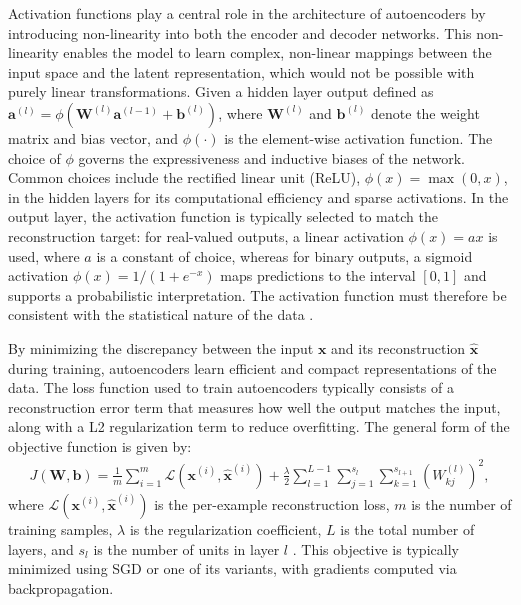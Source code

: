 Activation functions play a central role in the architecture of autoencoders by introducing non-linearity into both the encoder and decoder networks. This non-linearity enables the model to learn complex, non-linear mappings between the input space and the latent representation, which would not be possible with purely linear transformations. Given a hidden layer output defined as $\mathbf{a}^{(l)} = \phi(\mathbf{W}^{(l)} \mathbf{a}^{(l-1)} + \mathbf{b}^{(l)})$, where $\mathbf{W}^{(l)}$ and $\mathbf{b}^{(l)}$ denote the weight matrix and bias vector, and $\phi(\cdot)$ is the element-wise activation function. The choice of $\phi$ governs the expressiveness and inductive biases of the network. Common choices include the rectified linear unit (ReLU), $\phi(x) = \max(0, x)$, in the hidden layers for its computational efficiency and sparse activations. In the output layer, the activation function is typically selected to match the reconstruction target: for real-valued outputs, a linear activation $\phi(x) = ax$ is used, where $a$ is a constant of choice, whereas for binary outputs, a sigmoid activation $\phi(x) = 1 / (1 + e^{-x})$ maps predictions to the interval $[0, 1]$ and supports a probabilistic interpretation. The activation function must therefore be consistent with the statistical nature of the data \citep{sharma2017activation}.

By minimizing the discrepancy between the input $\mathbf{x}$ and its reconstruction $\hat{\mathbf{x}}$ during training, autoencoders learn efficient and compact representations of the data. The loss function used to train autoencoders typically consists of a reconstruction error term that measures how well the output matches the input, along with a L2 regularization term to reduce overfitting. The general form of the objective function is given by:
\begin{align} \label{eq:loss_func}
J(\mathbf{W}, \mathbf{b}) = \frac{1}{m} \sum_{i=1}^{m} \mathcal{L}(\mathbf{x}^{(i)}, \hat{\mathbf{x}}^{(i)}) + \frac{\lambda}{2} \sum_{l=1}^{L-1} \sum_{j=1}^{s_l} \sum_{k=1}^{s_{l+1}} \left( W_{kj}^{(l)} \right)^2,
\end{align}
where $\mathcal{L}(\mathbf{x}^{(i)}, \hat{\mathbf{x}}^{(i)})$ is the per-example reconstruction loss, $m$ is the number of training samples, $\lambda$ is the regularization coefficient, $L$ is the total number of layers, and $s_l$ is the number of units in layer $l$ \citep{sakurada2014anomaly}. This objective is typically minimized using SGD or one of its variants, with gradients computed via backpropagation.

